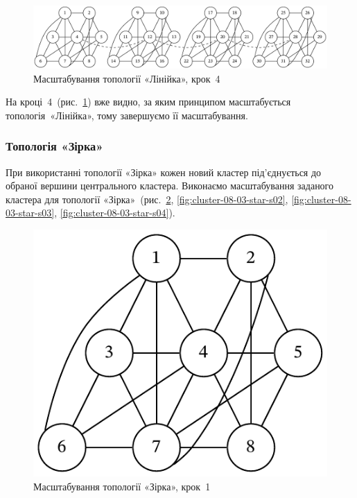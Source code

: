 \documentclass[
	a4paper,
	oneside,
	BCOR = 10mm,
	DIV = 12,
	12pt,
	headings = normal,
]{scrartcl}
\begin{document}
				\begin{figure}[!htbp]
					\centering
					\includegraphics[width=\columnwidth]{./assets/cluster-08-02-line-s04.pdf}
					\caption{Масштабування топології «Лінійка», крок~4}
					\label{fig:cluster-08-02-line-s04}
				\end{figure}

				На кроці~4~(рис.~\ref{fig:cluster-08-02-line-s04}) вже видно, за яким принципом масштабується топологія~«Лінійка», тому завершуємо її масштабування.

			\subsubsection{Топологія «Зірка»}
				При використанні топології «Зірка» кожен новий кластер під'єднується до обраної вершини центрального кластера. Виконаємо масштабування заданого кластера для топології «Зірка»~(рис.~\ref{fig:cluster-08-03-star-s01}, \ref{fig:cluster-08-03-star-s02}, \ref{fig:cluster-08-03-star-s03}, \ref{fig:cluster-08-03-star-s04}).

				\begin{figure}[!htbp]
					\centering
					\includegraphics[height=6\baselineskip]{./assets/cluster-08-01-named.pdf}
					\caption{Масштабування топології «Зірка», крок~1}
					\label{fig:cluster-08-03-star-s01}
				\end{figure}
\end{document}
